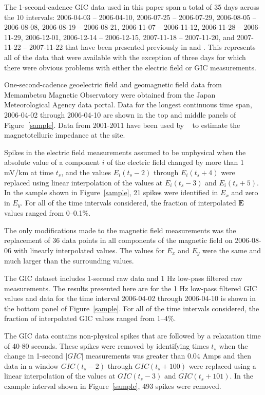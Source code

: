 \documentclass[draft,linenumbers]{agujournal2018}
\begin{document}
The 1-second-cadence GIC data used in this paper span a total of 35 days across the 10 intervals: 2006-04-03 -- 2006-04-10, 2006-07-25 -- 2006-07-29, 2006-08-05 -- 2006-08-08, 2006-08-19 -- 2006-08-21, 2006-11-07 -- 2006-11-12, 2006-11-28 -- 2006-11-29, 2006-12-01, 2006-12-14 -- 2006-12-15, 2007-11-18 -- 2007-11-20, and 2007-11-22 -- 2007-11-22 that have been presented previously in \citet{Watari2009} and \cite{Watari2015}. This represents all of the data that were available with the exception of three days for which there were obvious problems with either the electric field or GIC measurements.

One-second-cadence geoelectric field and geomagnetic field data from Memambetsu Magnetic Observatory were obtained from the Japan Meteorological Agency data portal. Data for the longest continuous time span, 2006-04-02 through 2006-04-10 are shown in the top and middle panels of Figure~\ref{sample}. Data from 2001-2011 have been used by ~\cite{Fujii2015} to estimate the magnetotelluric impedance at the site.

Spikes in the electric field measurements assumed to be unphysical when the absolute value of a component $i$ of the electric field changed by more than 1 mV/km at time $t_s$, and the values $E_i(t_s-2)$ through $E_i(t_s+4)$ were replaced using linear interpolation of the values at $E_i(t_s-3)$ and $E_i(t_s + 5)$. In the sample shown in Figure~\ref{sample}, 21 spikes were identified in $E_x$ and zero in $E_y$. For all of the time intervals considered, the fraction of interpolated $\mathbf{E}$ values ranged from 0--0.1\%.

The only modifications made to the magnetic field measurements was the replacement of 36 data points in all components of the magnetic field on 2006-08-06 with linearly interpolated values. The values for $E_x$ and $E_y$ were the same and much larger than the surrounding values.

The GIC dataset includes 1-second raw data and 1 Hz low-pass filtered raw measurements.  The results presented here are for the 1 Hz low-pass filtered GIC values and data for the time interval 2006-04-02 through 2006-04-10 is shown in the bottom panel of Figure~\ref{sample}. For all of the time intervals considered, the fraction of interpolated GIC values ranged from 1--4\%.

The GIC data contains non-physical spikes that are followed by a relaxation time of  40-80 seconds. These spikes were removed by identifying times $t_s$ when the change in 1-second $|GIC|$ measurements was greater than $0.04$ Amps and then data in a window $GIC(t_s-2)$ through $GIC(t_s+100)$ were replaced using a linear interpolation of the values at $GIC(t_s-3)$ and $GIC(t_s + 101)$. In the example interval shown in Figure~\ref{sample}, 493 spikes were removed.
\end{document}
